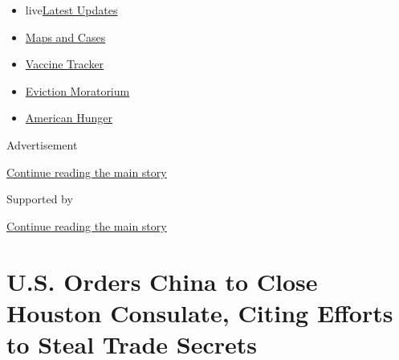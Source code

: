 \begin{itemize}
\tightlist
\item
  live\href{https://www.nytimes3xbfgragh.onion/2020/09/05/world/coronavirus-covid.html?name=styln-coronavirus-national\&region=TOP_BANNER\&block=storyline_menu_recirc\&action=click\&pgtype=Article\&impression_id=aa1683b0-efb6-11ea-ba7d-2b22bdc536a2\&variant=undefined}{Latest
  Updates}
\item
  \href{https://www.nytimes3xbfgragh.onion/interactive/2020/us/coronavirus-us-cases.html?name=styln-coronavirus-national\&region=TOP_BANNER\&block=storyline_menu_recirc\&action=click\&pgtype=Article\&impression_id=aa1683b1-efb6-11ea-ba7d-2b22bdc536a2\&variant=undefined}{Maps
  and Cases}
\item
  \href{https://www.nytimes3xbfgragh.onion/interactive/2020/science/coronavirus-vaccine-tracker.html?name=styln-coronavirus-national\&region=TOP_BANNER\&block=storyline_menu_recirc\&action=click\&pgtype=Article\&impression_id=aa1683b2-efb6-11ea-ba7d-2b22bdc536a2\&variant=undefined}{Vaccine
  Tracker}
\item
  \href{https://www.nytimes3xbfgragh.onion/2020/09/02/your-money/eviction-moratorium-covid.html?name=styln-coronavirus-national\&region=TOP_BANNER\&block=storyline_menu_recirc\&action=click\&pgtype=Article\&impression_id=aa1683b3-efb6-11ea-ba7d-2b22bdc536a2\&variant=undefined}{Eviction
  Moratorium}
\item
  \href{https://www.nytimes3xbfgragh.onion/interactive/2020/09/02/magazine/food-insecurity-hunger-us.html?name=styln-coronavirus-national\&region=TOP_BANNER\&block=storyline_menu_recirc\&action=click\&pgtype=Article\&impression_id=aa1683b4-efb6-11ea-ba7d-2b22bdc536a2\&variant=undefined}{American
  Hunger}
\end{itemize}

Advertisement

\protect\hyperlink{after-top}{Continue reading the main story}

Supported by

\protect\hyperlink{after-sponsor}{Continue reading the main story}

\hypertarget{us-orders-china-to-close-houston-consulate-citing-efforts-to-steal-trade-secrets}{%
\section{U.S. Orders China to Close Houston Consulate, Citing Efforts to
Steal Trade
Secrets}\label{us-orders-china-to-close-houston-consulate-citing-efforts-to-steal-trade-secrets}}

